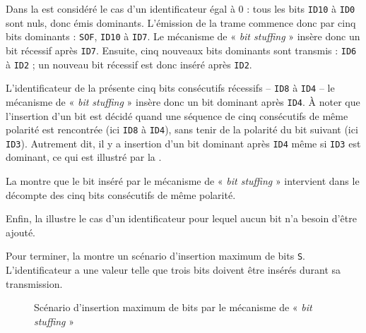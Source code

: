 Dans la  est considéré le cas d'un identificateur égal à $0$ : tous les bits \texttt{ID10} à \texttt{ID0} sont nuls, donc émis dominants. L'émission de la trame commence donc par cinq bits dominants : \texttt{SOF}, \texttt{ID10} à \texttt{ID7}. Le mécanisme de « \emph{bit stuffing} » insère donc un bit récessif après \texttt{ID7}. Ensuite, cinq nouveaux bits dominants sont transmis : \texttt{ID6} à \texttt{ID2} ; un nouveau bit récessif est donc inséré après \texttt{ID2}.

L'identificateur de la  présente cinq bits consécutifs récessifs -- \texttt{ID8} à \texttt{ID4} -- le mécanisme de « \emph{bit stuffing} » insère donc un bit dominant après \texttt{ID4}. À noter que l'insertion d'un bit est décidé quand une séquence de cinq consécutifs de même polarité est rencontrée (ici \texttt{ID8} à \texttt{ID4}), sans tenir de la polarité du bit suivant (ici \texttt{ID3}). Autrement dit, il y a insertion d'un bit dominant après \texttt{ID4} même si \texttt{ID3} est dominant, ce qui est illustré par la .

La  montre que le bit inséré par le mécanisme de « \emph{bit stuffing} » intervient dans le décompte des cinq bits consécutifs de même polarité. 


Enfin, la  illustre le cas d'un identificateur pour lequel aucun bit n'a besoin d'être ajouté.

Pour terminer, la  montre un scénario d'insertion maximum de bits \texttt{S}. L'identificateur a une valeur telle que trois bits doivent être insérés durant sa transmission.

\begin{figure}[h]
  \centering
  \caption{Scénario d'insertion maximum de bits par le mécanisme de « \emph{bit stuffing} »}
\end{figure}



